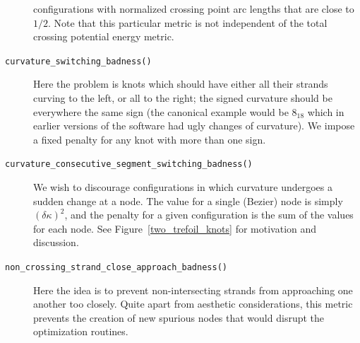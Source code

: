 \documentclass{birkjour}
\theoremstyle{definition}
\theoremstyle{remark}
\numberwithin{equation}{section}
\begin{document}
\begin{description}
  configurations with normalized crossing point arc lengths that are
  close to $1/2$.  Note that this particular metric is not independent
  of the total crossing potential energy metric.
\item[{\tt curvature\_switching\_badness()}] Here the problem is knots
  which should have either all their strands curving to the left, or
  all to the right; the signed curvature should be everywhere the same
  sign (the canonical example would be $8_{18}$ which in earlier
  versions of the software had ugly changes of curvature).  We impose
  a fixed penalty for any knot with more than one sign.
\item[{\tt curvature\_consecutive\_segment\_switching\_badness()}] We
  wish to discourage configurations in which curvature undergoes a
  sudden change at a node.  The value for a single (Bezier) node is
  simply $\left(\delta\kappa\right)^2$, and the penalty for a given
  configuration is the sum of the values for each node.  See
  Figure~\ref{two_trefoil_knots} for motivation and discussion.
\item[{\tt non\_crossing\_strand\_close\_approach\_badness()}] Here
  the idea is to prevent non-intersecting strands from approaching one
  another too closely.  Quite apart from aesthetic considerations,
  this metric prevents the creation of new spurious nodes that would
  disrupt the optimization routines.
\end{description}
\end{document}
